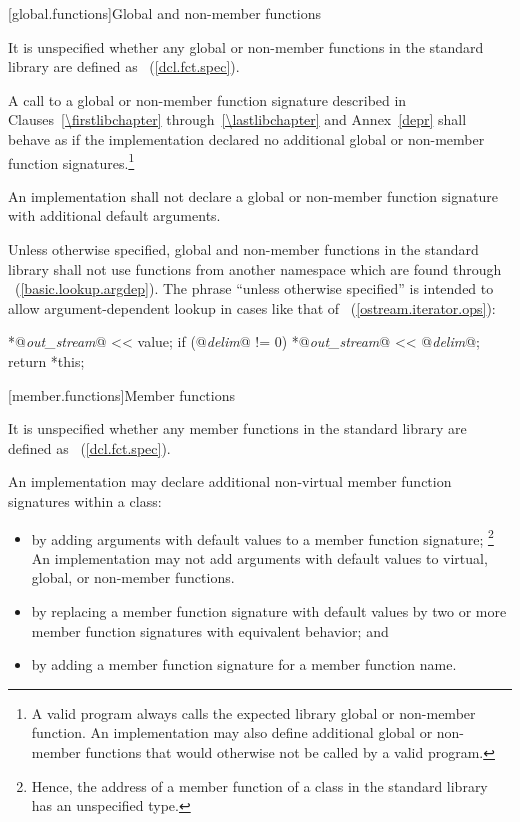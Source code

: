 [global.functions]{Global and non-member functions}

\pnum
It is unspecified whether any global
or non-member
functions in the \Cpp standard library are defined as
~(\ref{dcl.fct.spec}).

\pnum
{}A call to a global or non-member function signature
described in Clauses~\ref{\firstlibchapter} through~\ref{\lastlibchapter} and
Annex~\ref{depr} shall behave as if the implementation declared no additional
global or non-member function signatures.\footnote{A valid \Cpp program always
calls the expected library global or non-member function. An implementation may
also define additional global or non-member functions that would otherwise not
be called by a valid \Cpp program.}

\pnum
An implementation shall not declare a global or non-member function signature
with additional default arguments.

\pnum
Unless otherwise specified, global and non-member functions in the standard
library shall not use functions from another namespace which are found through
~(\ref{basic.lookup.argdep}).
\enternote
The phrase ``unless otherwise specified'' is intended to allow
argument-dependent lookup
in cases like that of
~(\ref{ostream.iterator.ops}):

\effects
\begin{codeblock}
*@\textit{out_stream}@ << value;
if (@\textit{delim}@ != 0)
  *@\textit{out_stream}@ << @\textit{delim}@;
return *this;
\end{codeblock}
\exitnote

[member.functions]{Member functions}

\pnum
It is unspecified whether any member functions in the \Cpp standard library are defined as
~(\ref{dcl.fct.spec}).

\pnum
An implementation may declare additional
non-virtual member function signatures within a
%
class:

\begin{itemize}
\item
by adding arguments with default values to a member function signature;%
%
\footnote{Hence, the address of a member function of a class in the \Cpp standard
library has an unspecified type.}
\enternote An implementation may not add arguments with default values to virtual,
global, or non-member functions.\exitnote
\item
by replacing a member function signature with default values by two
or more member function signatures with equivalent behavior; and
\item
by adding a member function signature for a member function name.
\end{itemize}

